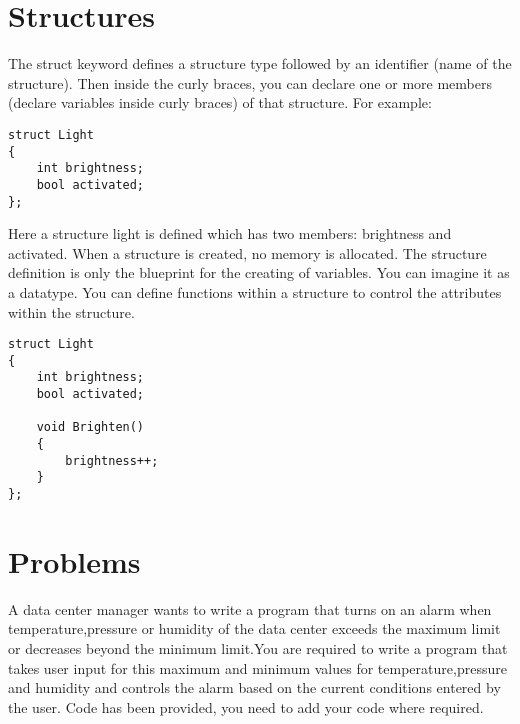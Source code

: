 \documentclass[11pt,fleqn]{book} %
\begin{document}
\section{Structures}
The struct keyword defines a structure type followed by an identifier (name of the structure). Then inside the curly braces, you can declare one or more members (declare variables inside curly braces) of that structure. For example:
\begin{lstlisting}
struct Light
{
	int brightness;
	bool activated;
};
\end{lstlisting}
Here a structure light is defined which has two members: brightness and activated. When a structure is created, no memory is allocated. The structure definition is only the blueprint for the creating of variables. You can imagine it as a datatype. You can define functions within a structure to control the attributes within the structure.
\begin{lstlisting}
struct Light
{
	int brightness;
	bool activated;
	
	void Brighten()
	{
		brightness++;
	}
};
\end{lstlisting}

\section{Problems}


\begin{problem}
	A data center manager wants to write a program that turns on an alarm when temperature,pressure or humidity of the data center exceeds the maximum limit or decreases beyond the minimum limit.You are required to write a program that takes user input for this maximum and minimum values for temperature,pressure and humidity and controls the alarm based on the current conditions entered by the user. Code has been provided, you need to add your code where required.\\

\end{problem}
\end{document}
